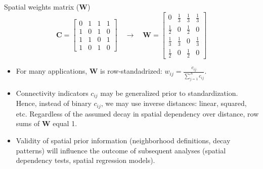 \documentclass{beamer}
\begin{document}
\begin{frame}{Spatial weights matrix ($\bm{W}$)}
\vspace{-0.5cm}
$$
\bm{C} = \begin{bmatrix}
0 & 1 & 1 & 1 \\
1 & 0 & 1 & 0 \\
1 & 1 & 0 & 1 \\
1 & 0 & 1 & 0
\end{bmatrix} \quad \rightarrow \quad
\bm{W}=
\begin{bmatrix}
0 & \tfrac{1}{3} & \tfrac{1}{3} & \tfrac{1}{3} \\[2pt]
\tfrac{1}{2} & 0 & \tfrac{1}{2} & 0 \\[2pt]
\tfrac{1}{3} & \tfrac{1}{3} & 0 & \tfrac{1}{3} \\[2pt]
\tfrac{1}{2} & 0 & \tfrac{1}{2} & 0
\end{bmatrix}
$$
\begin{itemize}
	\item For many applications, $\bm{W}$ is row-standadrized: 
	$w_{ij} = \frac{c_{ij}}{\sum^N_{j=1} c_{ij}}$.
	\medskip
	\item Connectivity indicators $c_{ij}$ may be generalized prior to standardization. Hence, instead of binary $c_{ij}$, we may use inverse distances: linear, squared, etc. Regardless of the assumed decay in spatial dependency over distance, row sums of $\bm{W}$ equal 1.
	\medskip 
	\item Validity of spatial prior information (neighborhood definitions, decay patterns) will influence the outcome of subsequent analyses (spatial dependency tests, spatial regression models).
\end{itemize}
\end{frame}
\end{document}
